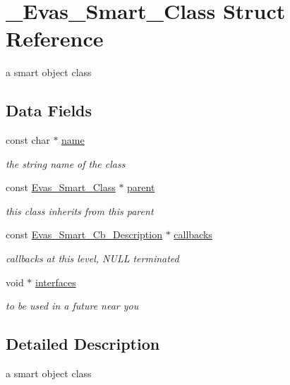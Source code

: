 \section{\_\-Evas\_\-Smart\_\-Class Struct Reference}
\label{struct__Evas__Smart__Class}


a smart object class  


\subsection*{Data Fields}
\begin{DoxyCompactItemize}
\item 
const char $\ast$ \hyperlink{struct__Evas__Smart__Class_a34b0476dfa714dff39812ed72636005f}{name}\label{struct__Evas__Smart__Class_a34b0476dfa714dff39812ed72636005f}

\begin{DoxyCompactList}\small\item\em the string name of the class \item\end{DoxyCompactList}\item 
const \hyperlink{struct__Evas__Smart__Class}{Evas\_\-Smart\_\-Class} $\ast$ \hyperlink{struct__Evas__Smart__Class_a4b009bf8125551b4bec8bc114756fc3e}{parent}\label{struct__Evas__Smart__Class_a4b009bf8125551b4bec8bc114756fc3e}

\begin{DoxyCompactList}\small\item\em this class inherits from this parent \item\end{DoxyCompactList}\item 
const \hyperlink{struct__Evas__Smart__Cb__Description}{Evas\_\-Smart\_\-Cb\_\-Description} $\ast$ \hyperlink{struct__Evas__Smart__Class_af7074494030024c3d0e502bca7b19067}{callbacks}\label{struct__Evas__Smart__Class_af7074494030024c3d0e502bca7b19067}

\begin{DoxyCompactList}\small\item\em callbacks at this level, NULL terminated \item\end{DoxyCompactList}\item 
void $\ast$ \hyperlink{struct__Evas__Smart__Class_a6698ec8ff46b2678f920979ae11d939d}{interfaces}\label{struct__Evas__Smart__Class_a6698ec8ff46b2678f920979ae11d939d}

\begin{DoxyCompactList}\small\item\em to be used in a future near you \item\end{DoxyCompactList}\end{DoxyCompactItemize}


\subsection{Detailed Description}
a smart object class 
